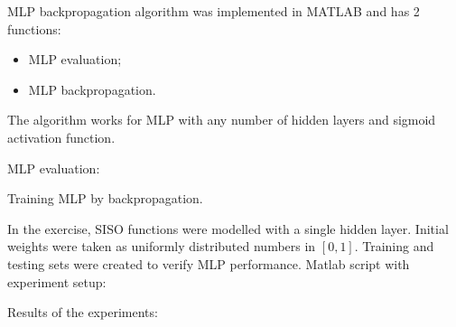 \documentclass[a4paper, 12pt]{article}
\begin{document}
MLP backpropagation algorithm was implemented in MATLAB and has 2 functions:
\begin{itemize}
\item MLP evaluation;

\item MLP backpropagation.
\end{itemize}

The algorithm works for MLP with any number of hidden layers and sigmoid activation function.
\medskip

MLP evaluation:
\medskip


\newpage

Training MLP by backpropagation.
\medskip


\medskip
In the exercise, SISO functions were modelled with a single hidden layer. Initial weights were taken as uniformly distributed numbers in $[0,1]$. Training and testing sets were created to verify MLP performance.
\medskip
Matlab script with experiment setup:



\newpage
Results of the experiments:
\end{document}
